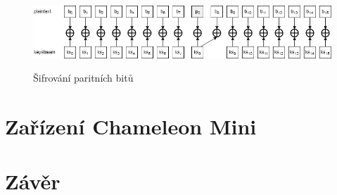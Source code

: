 \begin{figure}[ht]\centering
  \centering
  \hspace*{-0.08\linewidth}
  \includegraphics[width=\linewidth]{obrazky-figures/parityBits.png}\\[1pt]  
  \caption{Šifrování paritních bitů \cite{Cryptanalisis}}    
  \label{parityDiagram}
\end{figure}





\chapter{Zařízení Chameleon Mini}
\label{zarizeni_chameleon_mini}







\chapter{Závěr}
\label{zaver}


